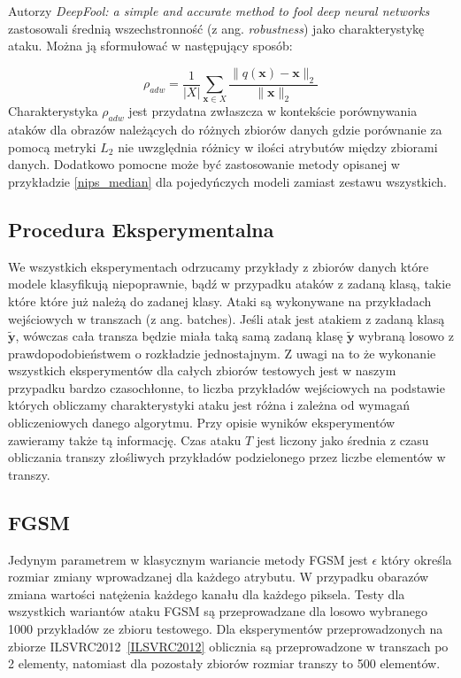 \documentclass[
    left=2.5cm,         %
    right=2.5cm,        %
    top=2.5cm,          %
    bottom=3cm,         %
    bindingoffset=6mm,  %
    nohyphenation=false %
]{eiti/eiti-thesis}
\renewcommand{\vec}[1]{\mathbf{#1}}
\begin{document}
    Autorzy \textit{DeepFool: a simple and accurate method to fool deep neural networks}\cite{DBLP:journals/corr/Moosavi-Dezfooli15}
    zastosowali średnią wszechstronność (z ang. \textit{robustness}) jako charakterystykę ataku. Można ją sformułować w następujący sposób:

    \begin{equation}
        \rho_{adw}=\frac{1}{|X|}\sum_{\vec{x} \in X} \frac{\|q(\vec{x}) - \vec{x}\|_2}{\|\vec{x}\|_2}
    \end{equation}
    Charakterystyka \(\rho_{adw}\) jest przydatna zwłaszcza w kontekście porównywania ataków dla obrazów należących do
    różnych zbiorów danych gdzie porównanie za pomocą metryki \(L_2\) nie uwzględnia różnicy w ilości atrybutów między zbiorami
    danych.
    Dodatkowo pomocne może być zastosowanie metody opisanej w przykładzie \eqref{nips_median} dla pojedyńczych modeli
    zamiast zestawu wszystkich.

\subsection{Procedura Eksperymentalna}
    We wszystkich eksperymentach odrzucamy przykłady z zbiorów danych które modele klasyfikują niepoprawnie, bądź w
    przypadku ataków z zadaną klasą, takie które które już należą do zadanej klasy. Ataki są wykonywane na przykładach
    wejściowych w transzach (z ang. batches).
Jeśli atak jest atakiem z zadaną klasą $\vec{\widetilde{y}}$, wówczas
    cała transza będzie miała taką samą zadaną klasę $\vec{\widetilde{y}}$ wybraną losowo z prawdopodobieństwem o
    rozkładzie jednostajnym.
Z uwagi na to że wykonanie wszystkich eksperymentów dla całych zbiorów testowych jest w naszym przypadku bardzo czasochłonne,
to liczba przykładów wejściowych na podstawie których obliczamy charakterystyki ataku jest różna i zależna od wymagań obliczeniowych
danego algorytmu. Przy opisie wyników eksperymentów zawieramy także tą informację.
Czas ataku $T$ jest liczony jako średnia z czasu obliczania transzy złośliwych przykładów podzielonego przez liczbe
elementów w transzy.

\subsection{FGSM}\label{FGSM-SCORES}
Jedynym parametrem w klasycznym wariancie metody FGSM jest \(\epsilon\) który określa rozmiar zmiany wprowadzanej dla
    każdego atrybutu. W przypadku obarazów zmiana wartości natężenia każdego kanału dla każdego piksela.
Testy dla wszystkich wariantów ataku FGSM są przeprowadzane dla losowo wybranego 1000 przykładów ze zbioru testowego.
Dla eksperymentów przeprowadzonych na zbiorze ILSVRC2012~\ref{ILSVRC2012} oblicznia są przeprowadzone w transzach po 2 elementy,
    natomiast dla pozostały zbiorów rozmiar transzy to 500 elementów.
\end{document}
